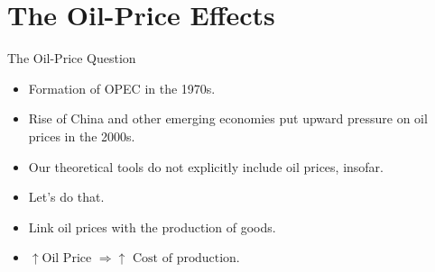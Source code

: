 \documentclass[shownotes,11pt, aspectratio=169]{beamer}
\begin{document}
\section{The Oil-Price Effects}
\begin{frame}{The Oil-Price Question}
\begin{itemize}
\item Formation of OPEC in the 1970s. 
\pause
\item Rise of China and other emerging economies put upward pressure on oil prices in the 2000s.
\pause
\item Our theoretical tools do not explicitly include oil prices, insofar.
\item Let's do that.
\pause
\item Link oil prices with the production of goods. 
\item $\uparrow \text{Oil Price } \Rightarrow \uparrow \text{ Cost of production}$.
\end{itemize}
\end{frame}
\end{document}
